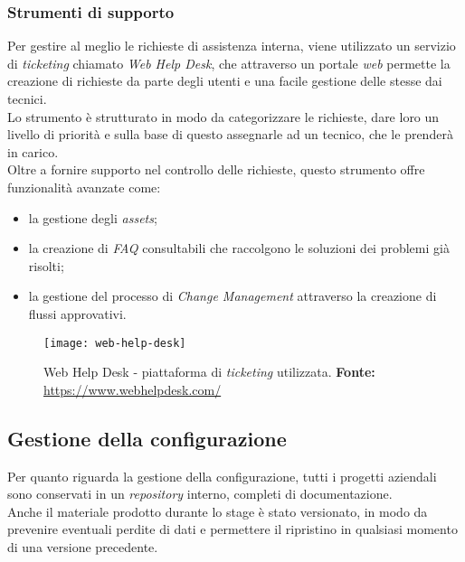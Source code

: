 
\subsubsection{Strumenti di supporto}

Per gestire al meglio le richieste di assistenza interna, viene utilizzato un servizio di \textit{ticketing} chiamato \textit{Web Help Desk}, che attraverso un portale \textit{web} permette la creazione di richieste da parte degli utenti e una facile gestione delle stesse dai tecnici. \\
Lo strumento è strutturato in modo da categorizzare le richieste, dare loro un livello di priorità e sulla base di questo assegnarle ad un tecnico, che le prenderà in carico.\\
Oltre a fornire supporto nel controllo delle richieste, questo strumento offre funzionalità avanzate come:
\begin{itemize}
	\item la gestione degli \textit{assets};
	\item la creazione di \textit{FAQ} consultabili che raccolgono le soluzioni dei problemi già risolti;
	\item la gestione del processo di \textit{Change Management} attraverso la creazione di flussi approvativi.
\end{itemize}

\vspace{10pt}
\begin{figure}[htbp]
	\begin{center}
		\texttt{[image: web-help-desk]}
		\caption{Web Help Desk - piattaforma di \textit{ticketing} utilizzata.\newline
		\textbf{Fonte: }\url{https://www.webhelpdesk.com/}}
	\end{center}
\end{figure}

\subsection{Gestione della configurazione}

Per quanto riguarda la gestione della configurazione, tutti i progetti aziendali sono conservati in un \textit{repository} interno, completi di documentazione. \\
Anche il materiale prodotto durante lo stage è stato versionato, in modo da prevenire eventuali perdite di dati e permettere il ripristino in qualsiasi momento di una versione precedente.

